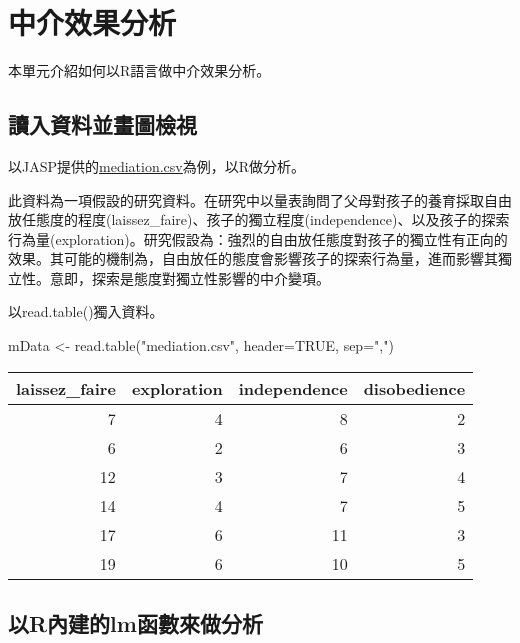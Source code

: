 \documentclass[
]{book}
\newenvironment{Shaded}{\begin{snugshade}}{\end{snugshade}}
\newcommand{\AttributeTok}[1]{\textcolor[rgb]{0.77,0.63,0.00}{#1}}
\newcommand{\ConstantTok}[1]{\textcolor[rgb]{0.00,0.00,0.00}{#1}}
\newcommand{\FunctionTok}[1]{\textcolor[rgb]{0.00,0.00,0.00}{#1}}
\newcommand{\NormalTok}[1]{#1}
\newcommand{\OtherTok}[1]{\textcolor[rgb]{0.56,0.35,0.01}{#1}}
\newcommand{\StringTok}[1]{\textcolor[rgb]{0.31,0.60,0.02}{#1}}
\begin{document}
\hypertarget{mediation}{%
\chapter{中介效果分析}\label{mediation}}

本單元介紹如何以R語言做中介效果分析。

\hypertarget{ux8b80ux5165ux8cc7ux6599ux4e26ux756bux5716ux6aa2ux8996-1}{%
\section{讀入資料並畫圖檢視}\label{ux8b80ux5165ux8cc7ux6599ux4e26ux756bux5716ux6aa2ux8996-1}}

以JASP提供的\href{https://jasp-stats.org/wp-content/uploads/2020/03/mediation.csv}{mediation.csv}為例，以R做分析。

此資料為一項假設的研究資料。在研究中以量表詢問了父母對孩子的養育採取自由放任態度的程度(laissez\_faire)、孩子的獨立程度(independence)、以及孩子的探索行為量(exploration)。研究假設為：強烈的自由放任態度對孩子的獨立性有正向的效果。其可能的機制為，自由放任的態度會影響孩子的探索行為量，進而影響其獨立性。意即，探索是態度對獨立性影響的中介變項。

以read.table()獨入資料。

\begin{Shaded}
\begin{Highlighting}[]
\NormalTok{mData }\OtherTok{\textless{}{-}} \FunctionTok{read.table}\NormalTok{(}\StringTok{"mediation.csv"}\NormalTok{, }\AttributeTok{header=}\ConstantTok{TRUE}\NormalTok{, }\AttributeTok{sep=}\StringTok{","}\NormalTok{)}
\end{Highlighting}
\end{Shaded}

\begin{tabular}{r|r|r|r}
\hline
laissez\_faire & exploration & independence & disobedience\\
\hline
7 & 4 & 8 & 2\\
\hline
6 & 2 & 6 & 3\\
\hline
12 & 3 & 7 & 4\\
\hline
14 & 4 & 7 & 5\\
\hline
17 & 6 & 11 & 3\\
\hline
19 & 6 & 10 & 5\\
\hline
\end{tabular}

\hypertarget{ux4ee5rux5167ux5efaux7684lmux51fdux6578ux4f86ux505aux5206ux6790}{%
\section{以R內建的lm函數來做分析}\label{ux4ee5rux5167ux5efaux7684lmux51fdux6578ux4f86ux505aux5206ux6790}}
\end{document}
